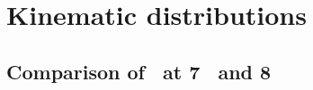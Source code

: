 %
%
%
%
\section{Kinematic distributions}

\subsection{Comparison of \ZZllll\ at 7 \tev\ and 8 \tev}

